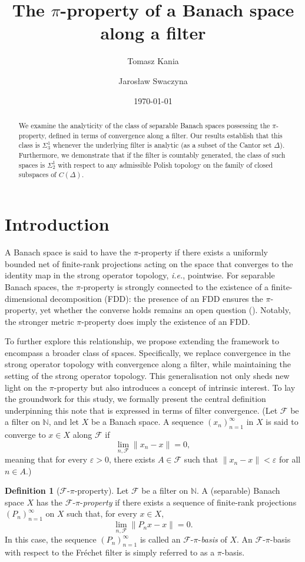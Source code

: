 \documentclass[12pt,fleqn]{amsart}
\title[Filter $\pi$-bases]{The $\pi$-property of a Banach space along a filter}
\author[T.~Kania]{Tomasz Kania}
\author[J.~Swaczyna]{Jaros{\l}aw Swaczyna}
\date{\today}
\newcommand{\N}{\mathbb{N}}
\theoremstyle{definition}
\newtheorem{definition}[theorem]{Definition}
\theoremstyle{remark}
\begin{document}
\maketitle
\begin{abstract}
    We examine the analyticity of the class of separable Banach spaces possessing the $\pi$-property, defined in terms of convergence along a filter. Our results establish that this class is $\Sigma^1_3$ whenever the underlying filter is analytic (as a subset of the Cantor set $\Delta$). Furthermore, we demonstrate that if the filter is countably generated, the class of such spaces is $\Sigma^1_2$ with respect to any admissible Polish topology on the family of closed subspaces of $C(\Delta)$.
\end{abstract}

\section{Introduction}
A Banach space is said to have the \(\pi\)-property if there exists a uniformly bounded net of finite-rank projections acting on the space that converges to the identity map in the strong operator topology, \emph{i.e.}, pointwise. For separable Banach spaces, the \(\pi\)-property is strongly connected to the existence of a finite-dimensional decomposition (FDD): the presence of an FDD ensures the \(\pi\)-property, yet whether the converse holds remains an open question (\cite[p.~3]{HajekMedina}). Notably, the stronger metric \(\pi\)-property does imply the existence of an FDD.

To further explore this relationship, we propose extending the framework to encompass a broader class of spaces. Specifically, we replace convergence in the strong operator topology with convergence along a filter, while maintaining the setting of the strong operator topology. This generalisation not only sheds new light on the \(\pi\)-property but also introduces a concept of intrinsic interest. To lay the groundwork for this study, we formally present the central definition underpinning this note that is expressed in terms of filter convergence. (Let \(\mathcal{F}\) be a filter on \(\N\), and let \(X\) be a Banach space. A sequence \((x_n)_{n=1}^\infty\) in \(X\) is said to converge to \(x \in X\) along \(\mathcal{F}\) if 
\[
    \lim_{n, \mathcal{F}} \|x_n - x\| = 0,
\]
meaning that for every \(\varepsilon > 0\), there exists \(A \in \mathcal{F}\) such that \(\|x_n - x\| < \varepsilon\) for all \(n \in A\).)

\begin{definition}[\(\mathcal{F}\)-\(\pi\)-property]\label{maindef}
Let \(\mathcal{F}\) be a filter on \(\mathbb{N}\). A (separable) Banach space \(X\) has the \(\mathcal{F}\)-\(\pi\)-\emph{property} if there exists a sequence of finite-rank projections \((P_n)_{n=1}^\infty\) on \(X\) such that, for every \(x \in X\),
\[
    \lim_{n, \mathcal{F}} \|P_n x - x\| = 0.
\]
In this case, the sequence \((P_n)_{n=1}^\infty\) is called an \(\mathcal{F}\)-\(\pi\)-\emph{basis} of \(X\). An \(\mathcal{F}\)-\(\pi\)-basis with respect to the Fréchet filter is simply referred to as a \(\pi\)-basis.
\end{definition}
\end{document}
